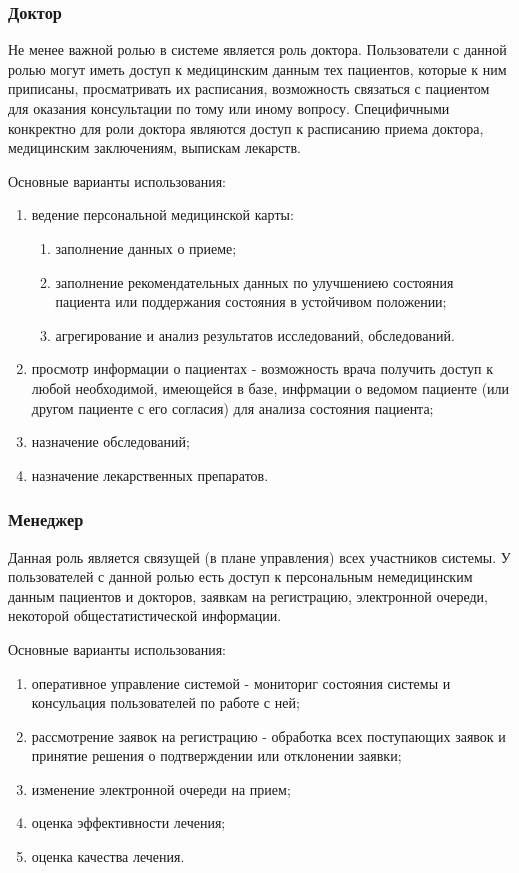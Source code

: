 \subsubsection{Доктор}
Не менее важной ролью в системе является роль доктора. Пользователи с данной ролью могут иметь доступ к медицинским данным тех пациентов, которые к ним приписаны, просматривать их расписания, возможность связаться с пациентом для оказания консультации по тому или иному вопросу. Специфичными конкректно для роли доктора являются доступ к расписанию приема доктора, медицинским заключениям, выпискам лекарств.

Основные варианты использования:	
\begin{enumerate}
  \item ведение персональной медицинской карты:
  \begin{enumerate}
  	\item заполнение данных о приеме;
  	\item заполнение рекомендательных данных по улучшениею состояния пациента
  	или поддержания состояния в устойчивом положении;
  	\item агрегирование и анализ результатов исследований, обследований.
  \end{enumerate}
  \item просмотр информации о пациентах - возможность врача получить доступ к
  любой необходимой, имеющейся в базе, инфрмации о ведомом пациенте (или другом
  пациенте с его согласия) для анализа состояния пациента;
  \item назначение обследований;
  \item назначение лекарственных препаратов. 
\end{enumerate}

\subsubsection{Менеджер}
Данная роль является связущей (в плане управления) всех участников системы. У
пользователей с данной ролью есть доступ к персональным немедицинским данным
пациентов и докторов, заявкам на регистрацию, электронной очереди, некоторой
общестатистической информации.

Основные варианты использования:

\begin{enumerate}
  \item оперативное управление системой - мониториг состояния системы и
  консульация пользователей по работе с ней;
  \item рассмотрение заявок на регистрацию - обработка всех поступающих заявок и
  принятие решения о подтверждении или отклонении заявки;
  \item изменение электронной очереди на прием;
  \item оценка эффективности лечения;
  \item оценка качества лечения.
\end{enumerate}

